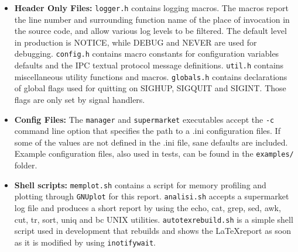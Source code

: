 \documentclass{article}
\begin{document}
\begin{itemize}
        \item \textbf{Header Only Files:} \texttt{logger.h} contains logging macros. The macros report the
        line number and surrounding function name of the place of invocation in
        the source code, and allow various log levels to be filtered. The default
        level in production is NOTICE, while DEBUG and NEVER are used for debugging.
        \texttt{config.h} contains macro constants for configuration
        variables defaults and the IPC textual protocol message definitions. \texttt{util.h}
        contains miscellaneous utility functions and macros.
        \texttt{globals.h} contains declarations of global flags
        used for quitting on SIGHUP,
        SIGQUIT and SIGINT. Those flags are only set by signal handlers.
        \item \textbf{Config Files:} The \texttt{manager} and
        \texttt{supermarket} executables accept the \texttt{-c} command line option
        that specifies the path to a .ini configuration files. If some of the
        values are not defined in the .ini file, sane defaults are included.
        Example configuration files, also used in tests, can be found in the \texttt{examples/} folder.
        \item \textbf{Shell scripts:} \texttt{memplot.sh} contains a script for memory profiling and plotting
        through \texttt{GNUplot} for this report.
        \texttt{analisi.sh} accepts a supermarket log file and produces
        a short report by using the echo, cat, grep, sed, awk, cut, tr, sort, uniq and bc
        UNIX utilities.
        \texttt{autotexrebuild.sh} is a simple shell script used in
        development that rebuilds and shows the \LaTeX \@ report as soon as it
        is modified by using \texttt{inotifywait}.

    \end{itemize}
\end{document}
